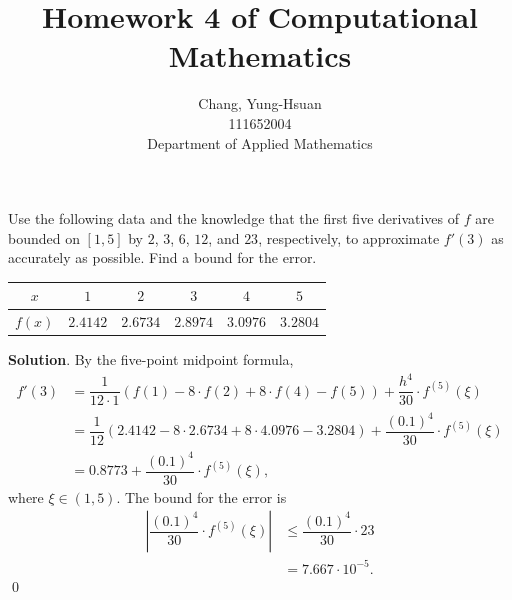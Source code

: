 \documentclass[11pt]{article}
\title{Homework 4 of Computational Mathematics}
\author{Chang, Yung-Hsuan\\111652004\\Department of Applied Mathematics}
\theoremstyle{break}
\numberwithin{equation}{theorem}
\begin{document}
\maketitle
\thispagestyle{empty}
\newpage
{}

\begin{problem}\label{problem 1} %
    Use the following data and the knowledge that the first five derivatives of $f$ are bounded on $[1, 5]$ by $2$, $3$, $6$, $12$, and $23$, respectively, to approximate $f'(3)$ as accurately as possible. Find a bound for the error.
    \begin{center}
        \begin{tabular}{c|c|c|c|c|c}
            $x$ & $1$ & $2$ & $3$ & $4$ & $5$ \\
            \hline
            $f(x)$ & $2.4142$ & $2.6734$ & $2.8974$ & $3.0976$ & $3.2804$
        \end{tabular}
    \end{center}
\end{problem}
\textbf{Solution}. By the five-point midpoint formula, \begin{align*}
    f'(3)&=\dfrac{1}{12\cdot 1}\left(f(1)-8\cdot f(2)+8\cdot f(4)-f(5)\right)+\dfrac{h^4}{30}\cdot f^{(5)}(\xi)\\
    &=\dfrac{1}{12}\left(2.4142-8\cdot 2.6734+8\cdot 4.0976-3.2804\right)+\dfrac{(0.1)^4}{30}\cdot f^{(5)}(\xi)\\
    &=0.8773+\dfrac{(0.1)^4}{30}\cdot f^{(5)}(\xi),
\end{align*}
where $\xi\in(1, 5)$. The bound for the error is \begin{align*}
    \left|\dfrac{(0.1)^4}{30}\cdot f^{(5)}(\xi)\right|&\leq\dfrac{(0.1)^4}{30}\cdot 23\\
    &=7.667\cdot 10^{-5}.
\end{align*} \qed
\end{document}

